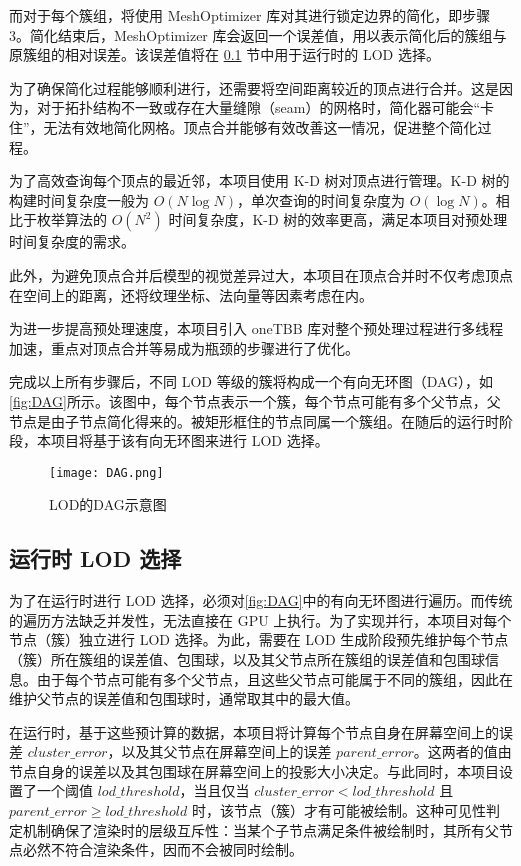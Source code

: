 而对于每个簇组，将使用 MeshOptimizer 库对其进行锁定边界的简化，即步骤 3。简化结束后，MeshOptimizer 库会返回一个误差值，用以表示简化后的簇组与原簇组的相对误差。该误差值将在 \ref{subsec:run-time lod select} 节中用于运行时的 LOD 选择。

为了确保简化过程能够顺利进行，还需要将空间距离较近的顶点进行合并。这是因为，对于拓扑结构不一致或存在大量缝隙（seam）的网格时，简化器可能会“卡住”，无法有效地简化网格。顶点合并能够有效改善这一情况，促进整个简化过程。

为了高效查询每个顶点的最近邻，本项目使用 K-D 树对顶点进行管理\cite{bentley1975}。K-D 树的构建时间复杂度一般为 $O(N\log N)$，单次查询的时间复杂度为 $O(\log N)$。相比于枚举算法的 $O(N^2)$ 时间复杂度，K-D 树的效率更高，满足本项目对预处理时间复杂度的需求。

此外，为避免顶点合并后模型的视觉差异过大，本项目在顶点合并时不仅考虑顶点在空间上的距离，还将纹理坐标、法向量等因素考虑在内。

为进一步提高预处理速度，本项目引入 oneTBB 库对整个预处理过程进行多线程加速\cite{oneTBB}，重点对顶点合并等易成为瓶颈的步骤进行了优化。

完成以上所有步骤后，不同 LOD 等级的簇将构成一个有向无环图（DAG），如\autoref{fig:DAG}所示\cite{WangXi2022}。该图中，每个节点表示一个簇，每个节点可能有多个父节点，父节点是由子节点简化得来的。被矩形框住的节点同属一个簇组。在随后的运行时阶段，本项目将基于该有向无环图来进行 LOD 选择。

\begin{figure}[ht]
    \centering
    \texttt{[image: DAG.png]}
    \caption{\label{fig:DAG}LOD的DAG示意图}
\end{figure}

\subsection{运行时 LOD 选择} \label{subsec:run-time lod select}

\par 为了在运行时进行 LOD 选择，必须对\autoref{fig:DAG}中的有向无环图进行遍历。而传统的遍历方法缺乏并发性，无法直接在 GPU 上执行。为了实现并行，本项目对每个节点（簇）独立进行 LOD 选择。为此，需要在 LOD 生成阶段预先维护每个节点（簇）所在簇组的误差值、包围球，以及其父节点所在簇组的误差值和包围球信息\cite{WangQian2016}。由于每个节点可能有多个父节点，且这些父节点可能属于不同的簇组，因此在维护父节点的误差值和包围球时，通常取其中的最大值。

在运行时，基于这些预计算的数据，本项目将计算每个节点自身在屏幕空间上的误差 $cluster\_error$，以及其父节点在屏幕空间上的误差 $parent\_error$。这两者的值由节点自身的误差以及其包围球在屏幕空间上的投影大小决定。与此同时，本项目设置了一个阈值 $lod\_threshold$，当且仅当 $cluster\_error < lod\_threshold$ 且 $parent\_error \geq lod\_threshold$ 时，该节点（簇）才有可能被绘制。这种可见性判定机制确保了渲染时的层级互斥性：当某个子节点满足条件被绘制时，其所有父节点必然不符合渲染条件，因而不会被同时绘制。

